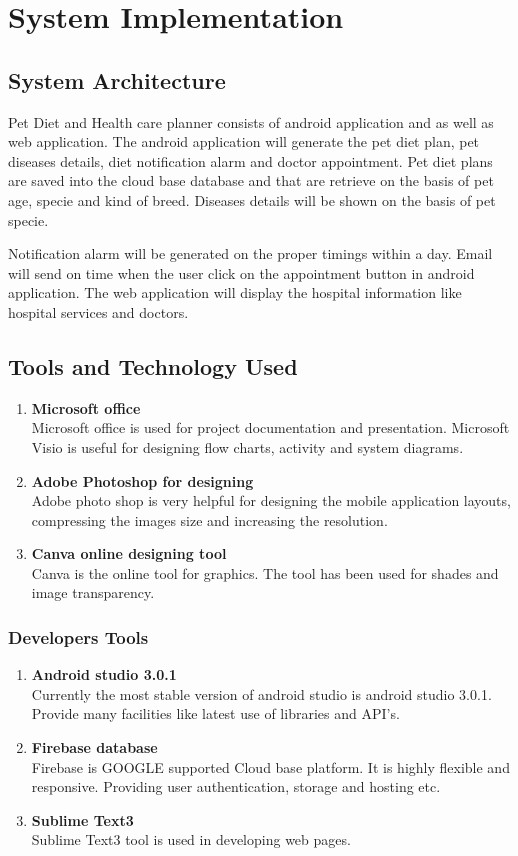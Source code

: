 \chapter{System Implementation} \label{chap:sysImplementation}

\section{System Architecture}
Pet Diet and Health care planner consists of android application and as well as web application. The android application will generate the pet diet plan, pet diseases details, diet notification alarm and doctor appointment. Pet diet plans are saved into the cloud base database and that are retrieve on the basis of pet age, specie and kind of breed. Diseases details will be shown on the basis of pet specie.\par Notification alarm will be generated on the proper timings within a day. Email will send on time when the user click on the appointment button in android application. The web application will display the hospital information like hospital services and doctors.

\section{Tools and Technology Used}
\begin{enumerate}
\item \textbf{Microsoft office}\\Microsoft office is used for project documentation and presentation. Microsoft Visio is useful for designing flow charts, activity and system diagrams.
\item \textbf{Adobe Photoshop for designing}\\Adobe photo shop is very helpful for designing the mobile application layouts, compressing the images size and increasing the resolution.
\item \textbf{Canva online designing tool}\\Canva is the online tool for graphics. The tool has been used for shades and image transparency.
\end{enumerate}


\subsection{Developers Tools}
\begin{enumerate}
\item \textbf{Android studio 3.0.1}\\
Currently the most stable version of android studio is android studio 3.0.1. Provide many facilities like latest use of libraries and API’s.
\item \textbf{Firebase  database}\\
Firebase is GOOGLE supported Cloud base platform. It is highly flexible and responsive. Providing user authentication, storage and hosting etc.
\item \textbf{Sublime Text3}\\
Sublime Text3 tool is used in developing web pages.
\end{enumerate}
